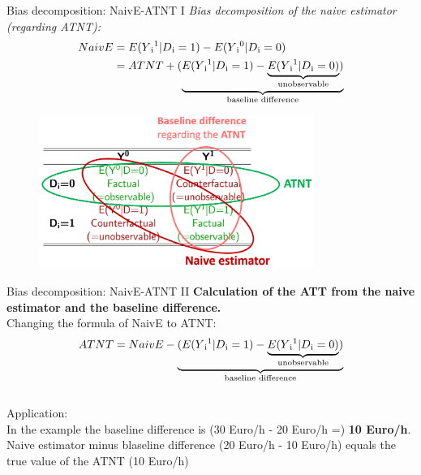 \documentclass{beamer}\usepackage[]{graphicx}\usepackage[]{xcolor}
\begin{document}
\begin{frame}{Bias decomposition: NaivE-ATNT I}
\textit{Bias decomposition of the naive estimator (regarding ATNT):}
\begin{align*}
NaivE &= E(Y\textsubscript{i}\textsuperscript{1}\vert D\textsubscript{i}=1)-E(Y\textsubscript{i}\textsuperscript{0} \vert D\textsubscript{i}=0) \\
&= ATNT + (\underbrace{E(Y\textsubscript{i}\textsuperscript{1} \vert D\textsubscript{i}=1) - \underbrace{E(Y\textsubscript{i}\textsuperscript{1} \vert D\textsubscript{i}=0)}_\text{unobservable})}_\text{baseline difference}
\end{align*}
\begin{figure}
\centering
\includegraphics[width=0.8\textwidth]{Graphics/Naive_ATNT_Baseline.png}
\end{figure}
\end{frame}

\begin{frame}{Bias decomposition: NaivE-ATNT II}
\textbf{Calculation of the ATT from the naive estimator and the baseline difference.}
\\[1em]
Changing the formula of NaivE to ATNT: \\
\begin{align*}
ATNT = NaivE - \underbrace{(E(Y\textsubscript{i}\textsuperscript{1} \vert D\textsubscript{i}=1) - \underbrace{E(Y\textsubscript{i}\textsuperscript{1} \vert D\textsubscript{i}=0)}_\text{unobservable})}_\text{baseline difference}
\end{align*}
\\[1em]
Application:\\
In the example the baseline difference is (30 Euro/h - 20 Euro/h =) \textbf{10 Euro/h}. Naive estimator minus blaseline difference (20 Euro/h - 10 Euro/h) equals the true value of the ATNT (10 Euro/h)
\end{frame}
\end{document}
